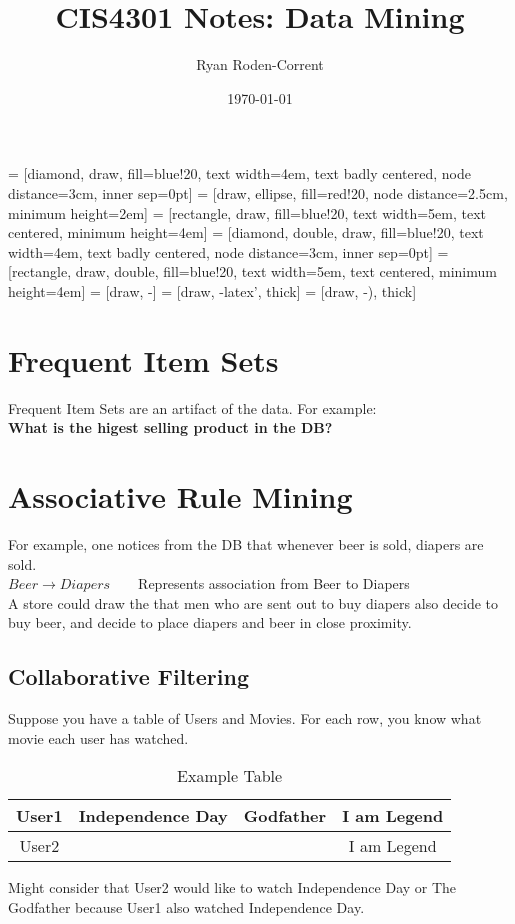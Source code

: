 \documentclass[12pt]{article}
\title{CIS4301 Notes: Data Mining}
\author{Ryan Roden-Corrent}
\date{\today}
\begin{document}
\setlength\parindent{0pt}
 = [diamond, draw, fill=blue!20, text width=4em,
  text badly centered, node distance=3cm, inner sep=0pt]
 = [draw, ellipse, fill=red!20, node distance=2.5cm,
  minimum height=2em]
 = [rectangle, draw, fill=blue!20, text width=5em,
  text centered, minimum height=4em]
 = [diamond, double, draw, fill=blue!20, text width=4em,
  text badly centered, node distance=3cm, inner sep=0pt]
 = [rectangle, draw, double, fill=blue!20, text width=5em,
  text centered, minimum height=4em]
 = [draw, -]
 = [draw, -latex', thick]
 = [draw, -), thick]
\maketitle
\section{Frequent Item Sets}
Frequent Item Sets are an artifact of the data. For example:\\
\textbf{What is the higest selling product in the DB?}

\section{Associative Rule Mining}
For example, one notices from the DB that whenever beer is sold, diapers are
sold.\\
${Beer \rightarrow Diapers}$ ~ \vline ~
Represents association from Beer to Diapers\\
A store could draw the that men who are sent out to buy diapers also
decide to buy beer, and decide to place diapers and beer in close proximity.

\subsection{Collaborative Filtering}
Suppose you have a table of Users and Movies. For each row, you know what movie
each user has watched.
\begin{table}[H]
  \centering
  \caption{Example Table}
  \begin{tabular}{|c|c|c|c|}
    \hline
    User1 &  Independence Day & Godfather & I am Legend\\
    \hline
    User2 &  & & I am Legend\\
    \hline
  \end{tabular}
\end{table}
Might consider that User2 would like to watch Independence Day or The Godfather
because User1 also watched Independence Day.
\end{document}
